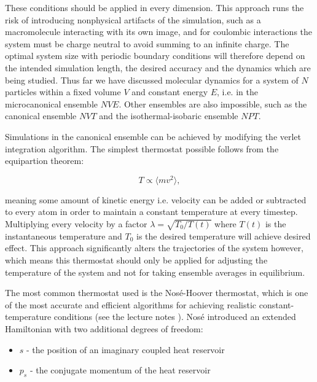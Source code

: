 These conditions should be applied in every dimension.
This approach runs the risk of introducing nonphysical artifacts
of the simulation, such as a macromolecule interacting with its own image,
and for coulombic interactions the system must be charge neutral to avoid
summing to an infinite charge.
The optimal system size with periodic boundary conditions
will therefore depend on the intended simulation length, the desired accuracy
and the dynamics which are being studied.
\newline
\newline
Thus far we have discussed molecular dynamics for a system of $N$ particles
within a fixed volume $V$ and constant energy $E$, i.e. in the
microcanonical ensemble $NVE$. Other ensembles are also impossible,
such as the canonical ensemble $NVT$ and the isothermal-isobaric ensemble
$NPT$.
\par
Simulations in the canonical ensemble can be achieved by modifying the verlet
integration algorithm. The simplest thermostat possible
follows from the equipartion theorem:

\begin{equation}
 T \propto \langle mv^2 \rangle , 
\end{equation}

meaning some amount of kinetic energy i.e. velocity
can be added or subtracted to every atom in order to maintain
a constant temperature at every timestep.
Multiplying every velocity by a factor $\lambda = \sqrt{T_0 / T(t)}$
where $T(t)$ is the instantaneous temperature and $T_0$
is the desired temperature will achieve desired effect.
This approach significantly alters the trajectories of the system however,
which means this thermostat should only be applied for adjusting
the temperature of the system and not for taking ensemble averages
in equilibrium.
\par
The most common thermostat used is the Nosé-Hoover thermostat,
which is one of the most accurate and efficient algorithms
for achieving realistic constant-temperature conditions
(see the lecture notes \parencite[Shell, M. Scott]{che210D2012}).
Nosé introduced an extended Hamiltonian with two additional degrees of freedom:

\begin{itemize}
    \item $s$ - the position of an imaginary coupled heat reservoir
    \item $p_s$ - the conjugate momentum of the heat reservoir
\end{itemize}

